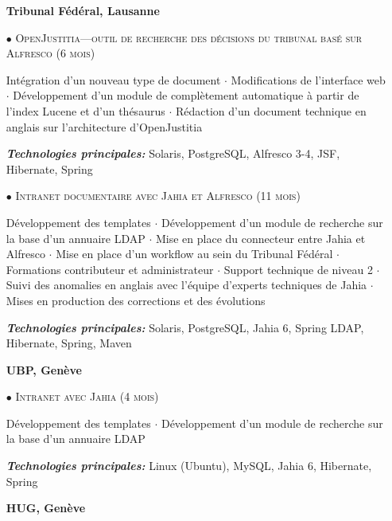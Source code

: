 \documentclass[10pt,a4paper]{moderncv}
\begin{document}
\begin{itemize}
		
	\item[] \textbf{Tribunal Fédéral, Lausanne}
	
	\item[$\bullet$] \textsc{OpenJustitia---outil de recherche des décisions du tribunal basé sur Alfresco (6 mois)}
	\item[] Intégration d'un nouveau type de document $\cdot$ Modifications de l'interface web $\cdot$ Développement d'un module de complètement automatique à partir de l'index Lucene et d'un thésaurus $\cdot$ Rédaction d'un document technique en anglais sur l'architecture d'OpenJustitia 	
	\item[] \emph{\textbf{Technologies principales:}} Solaris, PostgreSQL, Alfresco 3-4, JSF, Hibernate, Spring
	      	      	      	
	\item[$\bullet$] \textsc{Intranet documentaire avec Jahia et Alfresco (11 mois)}
	\item[] Développement des templates $\cdot$ Développement d'un module de recherche sur la base d'un annuaire LDAP $\cdot$ Mise en place du connecteur entre Jahia et Alfresco $\cdot$ Mise en place d'un workflow au sein du Tribunal Fédéral $\cdot$ Formations contributeur et administrateur $\cdot$ Support technique de niveau 2 $\cdot$ Suivi des anomalies en anglais avec l'équipe d'experts techniques de Jahia $\cdot$ Mises en production des corrections et des évolutions
	\item[] \emph{\textbf{Technologies principales:}} Solaris, PostgreSQL, Jahia 6, Spring LDAP, Hibernate, Spring, Maven
	      	      	      	
	\item[] \textbf{UBP, Genève}
	
	\item[$\bullet$] \textsc{Intranet avec Jahia (4 mois)}
	\item[] Développement des templates $\cdot$ Développement d'un module de recherche sur la base d'un annuaire LDAP
	\item[] \emph{\textbf{Technologies principales:}} Linux (Ubuntu), MySQL, Jahia 6, Hibernate, Spring
	      	      	      	
	\item[] \textbf{HUG, Genève}
	

\end{itemize}
\end{document}
